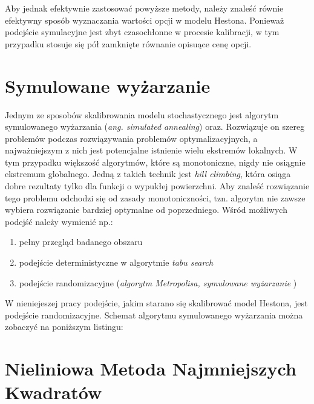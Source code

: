 \documentclass{pracamgr}
\begin{document}
Aby jednak efektywnie zastosować powyższe metody, należy znaleść równie efektywny sposób wyznaczania wartości opcji w modelu Hestona. Ponieważ podejście symulacyjne jest zbyt czasochłonne w procesie kalibracji, w tym przypadku stosuje się pół zamknięte równanie opisuące cenę opcji.

\section{Symulowane wyżarzanie}

Jednym ze sposobów skalibrowania modelu stochastycznego jest algorytm symulowanego wyżarzania  (\textit{ang. simulated annealing}) oraz. Rozwiązuje on szereg problemów podczas rozwiązywania problemów optymalizacyjnych, a najważniejszym z nich jest potencjalne istnienie wielu ekstremów lokalnych.
W tym przypadku większość algorytmów, które są monotoniczne, nigdy nie osiągnie ekstremum globalnego. Jedną z takich technik jest \textit{hill climbing}, która osiąga dobre rezultaty tylko dla funkcji o wypukłej powierzchni. Aby znaleść rozwiązanie tego problemu odchodzi się od zasady monotoniczności, tzn. algorytm nie zawsze wybiera rozwiązanie bardziej optymalne od poprzedniego. 
Wśród możliwych podejść należy wymienić np.:
\begin{enumerate}
  \item pełny przegląd badanego obszaru
  \item podejście deterministyczne w algorytmie \textit{tabu search}
  \item podejście randomizacyjne (\textit{algorytm Metropolisa, symulowane wyżarzanie} \cite{OptimalizationBySimulatedAnnealing} )
\end{enumerate}


W nieniejeszej pracy podejście, jakim starano się skalibrować model Hestona, jest podejście randomizacyjne.
Schemat algorytmu symulowanego wyżarzania można zobaczyć na poniższym listingu:



\section{Nieliniowa Metoda Najmniejszych Kwadratów}
\end{document}
